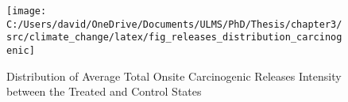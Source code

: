 \begin{figure}[H]
    \centering
    \texttt{[image: C:/Users/david/OneDrive/Documents/ULMS/PhD/Thesis/chapter3/src/climate\_change/latex/fig\_releases\_distribution\_carcinogenic]}
    \caption{Distribution of Average Total Onsite Carcinogenic Releases Intensity between the Treated and Control States}
    \label{fig:releases-distribution-carcinogenic}
\end{figure}